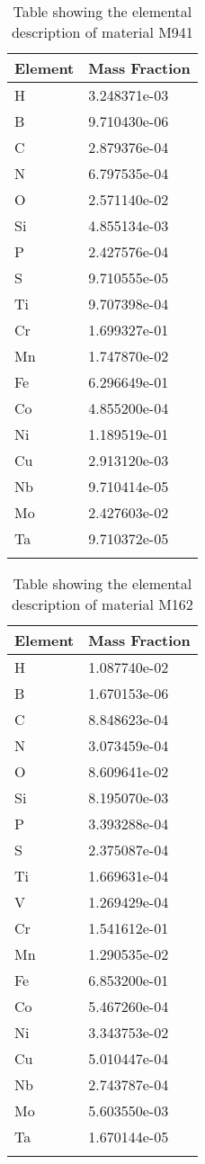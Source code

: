 \begin{centering}
\begin{longtable}[ht!]
{ p{} | p{} }
\hline
Element & Mass Fraction\\
\hline
H &  3.248371e-03\\
B &  9.710430e-06\\
C &  2.879376e-04\\
N &  6.797535e-04\\
O &  2.571140e-02\\
Si &  4.855134e-03\\
P &  2.427576e-04\\
S &  9.710555e-05\\
Ti &  9.707398e-04\\
Cr &  1.699327e-01\\
Mn &  1.747870e-02\\
Fe &  6.296649e-01\\
Co &  4.855200e-04\\
Ni &  1.189519e-01\\
Cu &  2.913120e-03\\
Nb &  9.710414e-05\\
Mo &  2.427603e-02\\
Ta &  9.710372e-05\\

\caption{Table showing the elemental description of material M941}
\label{table:material_EPP2L}
\end{longtable}
\clearpage

\begin{longtable}[ht!]
{ p{} | p{} }
\hline
Element & Mass Fraction\\
\hline
H &  1.087740e-02\\
B &  1.670153e-06\\
C &  8.848623e-04\\
N &  3.073459e-04\\
O &  8.609641e-02\\
Si &  8.195070e-03\\
P &  3.393288e-04\\
S &  2.375087e-04\\
Ti &  1.669631e-04\\
V &  1.269429e-04\\
Cr &  1.541612e-01\\
Mn &  1.290535e-02\\
Fe &  6.853200e-01\\
Co &  5.467260e-04\\
Ni &  3.343753e-02\\
Cu &  5.010447e-04\\
Nb &  2.743787e-04\\
Mo &  5.603550e-03\\
Ta &  1.670144e-05\\
\caption{Table showing the elemental description of material M162}
\label{table:material_M162}
\end{longtable}            
\clearpage

\end{centering}
